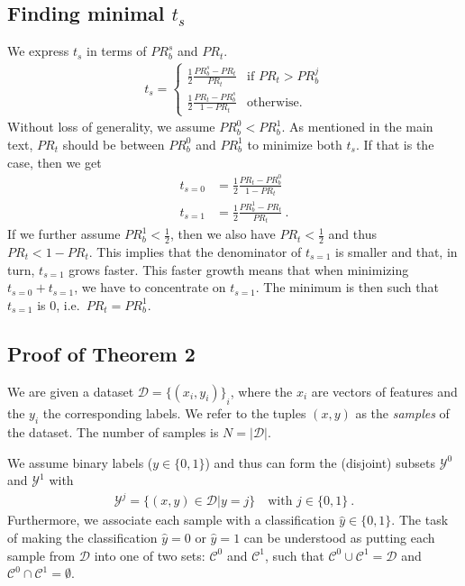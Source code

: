 \subsection{Finding minimal $t_s$}
We express $t_s$ in terms of $\mathit{PR}_b^s$ and $\mathit{PR}_t$.
\begin{align}
  t_s = \begin{cases}
    \frac{1}{2}\frac{\mathit{PR}_b^s - \mathit{PR}_t}{\mathit{PR}_t} &\text{if }\mathit{PR}_t>\mathit{PR}_b^j\\
    \frac{1}{2}\frac{\mathit{PR}_t - \mathit{PR}_b^s}{1 - \mathit{PR}_t} &\text{otherwise.}
  \end{cases}\label{eq:ts-pr2}
\end{align}
Without loss of generality, we assume $\mathit{PR}_b^0<\mathit{PR}_b^1$.
As mentioned in the main text, 
$\mathit{PR}_t$ should be between $\mathit{PR}_b^0$ and $\mathit{PR}_b^1$ to minimize both $t_s$.
If that is the case, then we get
\begin{align}
  t_{s=0} &= \frac{1}{2}\frac{\mathit{PR}_t - \mathit{PR}_b^0}{1 - \mathit{PR}_t}\\
  t_{s=1} &= \frac{1}{2}\frac{\mathit{PR}_b^1 - \mathit{PR}_t}{\mathit{PR}_t}~.
\end{align}
If we further assume $\mathit{PR}_b^1<\tfrac{1}{2}$,
then we also have $\mathit{PR}_t<\tfrac{1}{2}$ and thus $\mathit{PR}_t<1-\mathit{PR}_t$.
This implies that the denominator of $t_{s=1}$ is smaller and that, in turn, $t_{s=1}$ grows faster.
This faster growth means that when minimizing $t_{s=0} + t_{s=1}$, we have to concentrate on $t_{s=1}$.
The minimum is then such that $t_{s=1}$ is 0, i.e.\ $\mathit{PR}_t=\mathit{PR}_b^1$.

\subsection{Proof of Theorem 2}
We are given a dataset $\mathcal{D} = {\{(x_i, y_i)\}}_i$,
where the $x_i$ are vectors of features and the $y_i$ the corresponding labels.
We refer to the tuples $(x, y)$ as the \emph{samples} of the dataset.
The number of samples is $N = |\mathcal{D}|$.

We assume binary labels ($y\in \{0, 1\}$) and thus can form the (disjoint) subsets $\mathcal{\mathcal{Y}}^0$ and $\mathcal{Y}^1$ with
\begin{align}
  \mathcal{Y}^j = \{(x, y)\in \mathcal{D}|y = j\}\quad\text{with } j\in\{0, 1\}~.
\end{align}
Furthermore, we associate each sample with a classification $\hat{y}\in \{0, 1\}$.
The task of making the classification $\hat{y}=0$ or $\hat{y}=1$ can be understood as putting each sample from $\mathcal{D}$
into one of two sets: $\mathcal{C}^0$ and $\mathcal{C}^1$,
such that $\mathcal{C}^0\cup\mathcal{C}^1 = \mathcal{D}$ and $\mathcal{C}^0\cap\mathcal{C}^1 = \emptyset$.

